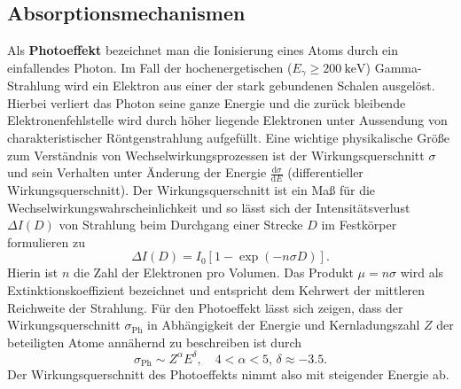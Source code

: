 \subsection{Absorptionsmechanismen}
Als \textbf{Photoeffekt} bezeichnet man die Ionisierung eines Atoms durch ein einfallendes Photon. Im Fall der 
hochenergetischen ($E_\gamma \geq  \SI{200}{\kilo\electronvolt}$) Gamma-Strahlung wird ein Elektron aus einer der stark gebundenen Schalen 
ausgelöst. Hierbei verliert das Photon seine ganze Energie und die zurück bleibende Elektronenfehlstelle wird durch 
höher liegende Elektronen unter Aussendung von charakteristischer Röntgenstrahlung aufgefüllt. Eine wichtige physikalische 
Größe zum Verständnis von Wechselwirkungsprozessen ist der Wirkungsquerschnitt $\sigma$ und sein Verhalten unter 
Änderung der Energie $\frac{\mathup{d}\sigma}{\mathup{d}E}$ (differentieller Wirkungsquerschnitt). Der Wirkungsquerschnitt 
ist ein Maß für die Wechselwirkungswahrscheinlichkeit und so lässt sich der Intensitätsverlust $\Delta I(D)$ von Strahlung beim Durchgang einer 
Strecke $D$ im Festkörper formulieren zu 
\begin{equation}
    \Delta I(D) = I_0 \left[1 -  \exp\left(- n \sigma D\right)\right].
\end{equation}
Hierin ist $n$ die Zahl der Elektronen pro Volumen. Das Produkt $\mu = n \sigma$ wird als Extinktionskoeffizient 
bezeichnet und entspricht dem Kehrwert der mittleren Reichweite der Strahlung.
Für den Photoeffekt lässt sich zeigen, dass der Wirkungsquerschnitt $\sigma_{\text{Ph}}$ in Abhängigkeit der Energie und 
Kernladungszahl $Z$ der beteiligten Atome annähernd zu beschreiben ist durch 
\begin{equation}
    \sigma_{\text{Ph}} \sim Z^{\alpha} E^{\delta}, \quad 4 < \alpha < 5, \, \delta \approx -\num{3.5}.
\end{equation}
Der Wirkungsquerschnitt des Photoeffekts nimmt also mit steigender Energie ab. 

